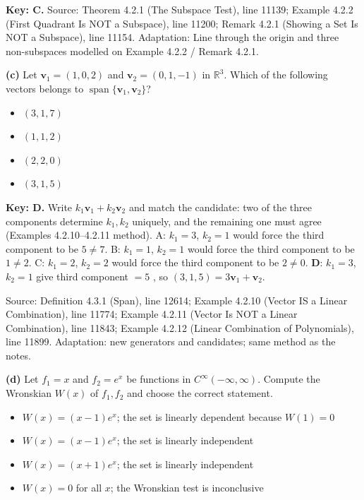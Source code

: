 \documentclass[11pt,a4paper]{article}
\newcommand{\Src}[1]{{\footnotesize\color{black!65}Source: #1}}
\begin{document}
\textbf{Key: C.} \Src{Theorem 4.2.1 (The Subspace Test), line 11139; Example 4.2.2 (First Quadrant Is NOT a Subspace), line 11200; Remark 4.2.1 (Showing a Set Is NOT a Subspace), line 11154. Adaptation: Line through the origin and three non-subspaces modelled on Example 4.2.2 / Remark 4.2.1.}\par
{}\textbf{(c)} Let $\mathbf{v}_1=(1,0,2)$ and $\mathbf{v}_2=(0,1,-1)$ in $\mathbb{R}^3$. Which of the following vectors belongs to $\operatorname{span}\{\mathbf{v}_1,\mathbf{v}_2\}$?\par
\begin{itemize}[leftmargin=8mm,itemsep=0pt]\item[A] $(3,1,7)$\item[B] $(1,1,2)$\item[C] $(2,2,0)$\item[D$^{\ast}$] $(3,1,5)$\end{itemize}
\textbf{Key: D.} Write $k_1\mathbf{v}_1+k_2\mathbf{v}_2$ and match the candidate: two of the three components determine $k_1,k_2$ uniquely, and the remaining one must agree (Examples 4.2.10--4.2.11 method). A: $k_1=3$, $k_2=1$ would force the third component to be $5\neq7$. B: $k_1=1$, $k_2=1$ would force the third component to be $1\neq2$. C: $k_1=2$, $k_2=2$ would force the third component to be $2\neq0$. \textbf{D}: $k_1=3$, $k_2=1$ give third component $=5$ \checkmark, so $(3,1,5)=3\mathbf{v}_1+\mathbf{v}_2$.\par
\Src{Definition 4.3.1 (Span), line 12614; Example 4.2.10 (Vector IS a Linear Combination), line 11774; Example 4.2.11 (Vector Is NOT a Linear Combination), line 11843; Example 4.2.12 (Linear Combination of Polynomials), line 11899. Adaptation: new generators and candidates; same method as the notes.}\par
{}\textbf{(d)} Let $f_1=x$ and $f_2=e^{x}$ be functions in $C^{\infty}(-\infty,\infty)$. Compute the Wronskian $W(x)$ of $f_1,f_2$ and choose the correct statement.\par
\begin{itemize}[leftmargin=8mm,itemsep=0pt]\item[A] $W(x)=(x-1)e^{x}$; the set is linearly dependent because $W(1)=0$\item[B$^{\ast}$] $W(x)=(x-1)e^{x}$; the set is linearly independent\item[C] $W(x)=(x+1)e^{x}$; the set is linearly independent\item[D] $W(x)=0$ for all $x$; the Wronskian test is inconclusive\end{itemize}
\end{document}
